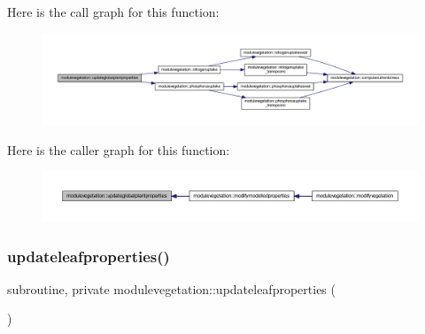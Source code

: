 Here is the call graph for this function\+:\nopagebreak
\begin{figure}[H]
\begin{center}
\leavevmode
\includegraphics[width=350pt]{namespacemodulevegetation_ad4d9e32956110026543f678e37dd08e1_cgraph}
\end{center}
\end{figure}
Here is the caller graph for this function\+:\nopagebreak
\begin{figure}[H]
\begin{center}
\leavevmode
\includegraphics[width=350pt]{namespacemodulevegetation_ad4d9e32956110026543f678e37dd08e1_icgraph}
\end{center}
\end{figure}
\mbox{\label{namespacemodulevegetation_a51955d069f261e54788d0be4185665b4}} 
\subsubsection{\texorpdfstring{updateleafproperties()}{updateleafproperties()}}
{\footnotesize\ttfamily subroutine, private modulevegetation\+::updateleafproperties (\begin{DoxyParamCaption}{ }\end{DoxyParamCaption})\hspace{0.3cm}{\ttfamily [private]}}

